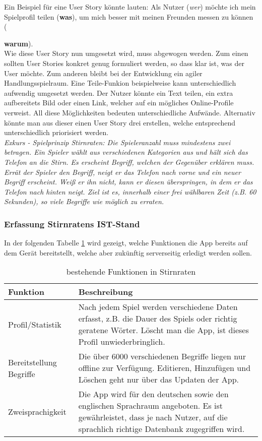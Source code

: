 Ein Beispiel für eine User Story könnte lauten: Als Nutzer (\textit{wer}) möchte ich mein Spielprofil teilen (\textbf{was}), um mich besser mit meinen Freunden messen zu können ({\textbf{warum}).\\
	
Wie diese User Story nun umgesetzt wird, muss abgewogen werden. Zum einen sollten User Stories konkret genug formuliert werden, so dass klar ist, was der User möchte. Zum anderen bleibt bei der Entwicklung ein agiler Handlungsspielraum.\cite{UserStoryMapping} Eine Teile-Funkion beispielweise kann unterschiedlich aufwendig umgesetzt werden. Der Nutzer könnte ein Text teilen, ein extra aufbereitets Bild oder einen Link, welcher auf ein mögliches Online-Profile verweist. All diese Möglichkeiten bedeuten unterschiedliche Aufwände. Alternativ könnte man aus dieser einen User Story drei erstellen, welche entsprechend unterschiedlich priorisiert werden.\\

\textit{Exkurs - Spielprinzip Stirnraten: Die Spieleranzahl muss mindestens zwei betragen. Ein Spieler wählt aus verschiedenen Kategorien aus und hält sich das Telefon an die Stirn. Es erscheint Begriff, welchen der Gegenüber erklären muss. Errät der Spieler den Begriff, neigt er das Telefon nach vorne und ein neuer Begriff erscheint. Weiß er ihn nicht, kann er diesen überspringen, in dem er das Telefon nach hinten neigt. Ziel ist es, innerhalb einer frei wählbaren Zeit (z.B. 60 Sekunden), so viele Begriffe wie möglich zu erraten.}

\subsubsection{Erfassung Stirnratens IST-Stand}

In der folgenden Tabelle \ref{tab:bestehende_funktionen} wird gezeigt, welche Funktionen die App bereits auf dem Gerät bereitstellt, welche aber zukünftig serverseitig erledigt werden sollen. 

\begin{table}[H]
	\begin{center}
		\begin{tabular}{p{3cm}p{10cm}}
			Funktion & Beschreibung \\ \hline
			Profil/Statistik & Nach jedem Spiel werden verschiedene Daten erfasst, z.B. die Dauer des Spiels oder richtig geratene Wörter. Löscht man die App, ist dieses Profil unwiederbringlich. \\
			Bereitstellung Begriffe & Die über 6000 verschiedenen Begriffe liegen nur offline zur Verfügung. Editieren, Hinzufügen und Löschen geht nur über das Updaten der App.\\
			Zweisprachigkeit & Die App wird für den deutschen sowie den englischen Sprachraum angeboten. Es ist gewährleistet, dass je nach Nutzer, auf die sprachlich richtige Datenbank zugegriffen wird.\\
		\end{tabular}
	\end{center}
	\caption[bestehende Funktionen in Stirnraten]{bestehende Funktionen in Stirnraten}
	\label{tab:bestehende_funktionen} 
\end{table}

}
